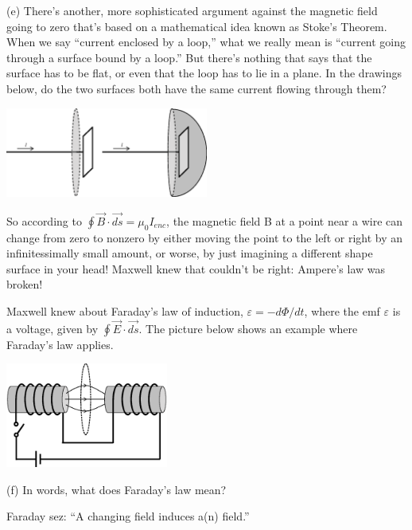 (e)  There's another, more sophisticated argument against the magnetic field going to zero that's based on a mathematical idea known as Stoke's Theorem.  When we say ``current enclosed by a loop,'' what we really mean is ``current going through a surface bound by a loop.'' But there's nothing that says that the surface has to be flat, or even that the loop has to lie in a plane.  In the drawings below, do the two surfaces both have the same current flowing through them?
\begin{center}
\vspace{-0.1in}
    \includegraphics[width=0.5\textwidth]{deriving_em_waves/two_surfaces.eps}
\vspace{-0.1in}
\end{center}

So according to $\oint \vec B \cdot \vec{ds} = \mu_0I_{enc}$, the magnetic field B at a point near a wire can change from zero to nonzero by either moving the point to the left or right by an infinitessimally small amount, or worse, by just imagining a different shape surface in your head!  Maxwell knew that couldn't be right: Ampere's law was broken!

Maxwell knew about Faraday's law of induction, $\varepsilon=-d \Phi/dt$, where the emf $\varepsilon$ is a voltage, given by $\oint \vec{E} \cdot \vec{ds}$.  The picture below shows an example where Faraday's law applies.  
\begin{center}
\vspace{-0.1in}
    \includegraphics[width=0.4\textwidth]{deriving_em_waves/faradays_law.eps}
\vspace{-0.1in}
\end{center}

(f) In words, what does Faraday's law mean?

\begin{center}
Faraday sez: ``A changing \underline{\hspace{1in}} field induces a(n) \underline{\hspace{1in}} field.''
\end{center}
   
